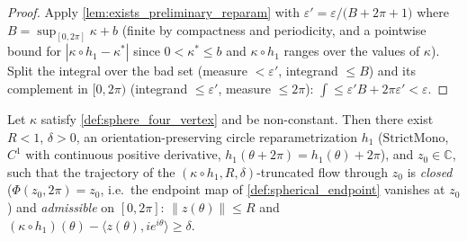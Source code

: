 \begin{proof}

\leanok
  Apply \cref{lem:exists_preliminary_reparam} with
  $\varepsilon'=\varepsilon/\bigl(B+2\pi+1\bigr)$ where
  $B=\sup_{[0,2\pi]}\kappa+b$ (finite by compactness and periodicity, and a pointwise
  bound for $|\kappa\circ h_1-\kappa^\ast|$ since $0<\kappa^\ast\le b$ and $\kappa\circ
  h_1$ ranges over the values of $\kappa$). Split the integral over the bad set (measure
  $<\varepsilon'$, integrand $\le B$) and its complement in $[0,2\pi)$ (integrand
  $\le\varepsilon'$, measure $\le2\pi$):
  $\int\le\varepsilon' B+2\pi\varepsilon'<\varepsilon$.
\end{proof}

\begin{lemma}
  \label{lem:spherical_endpoint_winding}
  Let $\kappa$ satisfy \cref{def:sphere_four_vertex} and be non-constant. Then there
  exist $R<1$, $\delta>0$, an orientation-preserving circle reparametrization $h_1$
  ($\mathrm{StrictMono}$, $C^1$ with continuous positive derivative,
  $h_1(\theta+2\pi)=h_1(\theta)+2\pi$), and $z_0\in\mathbb C$, such that the trajectory
  of the $(\kappa\circ h_1,R,\delta)$-truncated flow through $z_0$ is \emph{closed}
  ($\Phi(z_0,2\pi)=z_0$, i.e.\ the endpoint map of \cref{def:spherical_endpoint}
  vanishes at $z_0$) and \emph{admissible} on $[0,2\pi]$:
  $\|z(\theta)\|\le R$ and
  $(\kappa\circ h_1)(\theta)-\langle z(\theta),ie^{i\theta}\rangle\ge\delta$.
\end{lemma}

